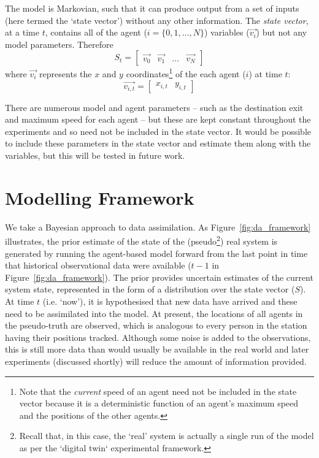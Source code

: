 \documentclass[runningheads]{llncs}
\begin{document}
The model is Markovian, such that it can produce  output from a set of inputs (here termed the `state vector') without any other information. The \textit{state vector}, at a time $t$, contains all of the agent ($i = \{ 0, 1, \dots, N \} $) variables ($\overrightarrow{v_i}$) but not any model parameters. Therefore 
\begin{equation}
S_t  = \left[ \begin{array}{cccc}
\overrightarrow{v_0} &  \overrightarrow{v_1} &  \dots & \overrightarrow{v_N} 
\end{array} \right]
\end{equation} 
where $\overrightarrow{v_i}$ represents the $x$ and $y$ coordinates\footnote{Note that the \textit{current} speed of an  agent need not be included in the state vector because it is a deterministic function of an agent's maximum speed and the positions of the other agents.} of the each agent ($i$) at time $t$:
\begin{equation}
\overrightarrow{v_{i,t}}  = \left[ \begin{array}{cc} x_{i,t} & y_{i,t} \end{array}  \right]
\end{equation}

There are numerous model and agent parameters -- such as the destination exit and maximum speed for each agent -- but these are kept constant throughout the experiments and so need not be included in the state vector. It would be possible to include these parameters in the state vector and estimate them along with the variables, but this will be tested in future work.

%
%
%
%
\section{Modelling Framework}

We take a Bayesian approach to data assimilation. As Figure~\ref{fig:da_framework} illustrates, the prior estimate of the state of the (pseudo\footnote{Recall that, in this case, the `real' system is actually a single run of the model as per the `digital twin` experimental framework.}) real system is generated by running the agent-based model forward from the last point in time that historical observational data were available ($t-1$ in Figure~\ref{fig:da_framework}). The prior provides uncertain estimates of the current system state, represented in the form of a distribution over the state vector ($S$). At time $t$ (i.e. `now'), it is hypothesised that new data have arrived and these need to be assimilated into the model. At present, the locations of all agents in the pseudo-truth are observed, which is analogous to every person in the station having their positions tracked. Although some noise is added to the observations, this is still more data than would usually be available in the real world and later experiments (discussed shortly) will reduce the amount of information provided. 
\end{document}
